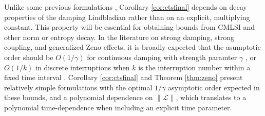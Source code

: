 \documentclass[accepted=2026-02-01, letterpaper]{quantumarticle}
\renewcommand{\L}{\mathcal{L}}
\begin{document}
Unlike some previous formulations \cite{zanardi_coherent_2014, popkov_effective_2018, burgarth_generalized_2019}, Corollary \ref{cor:ctsfinal} depends on decay properties of the damping Lindbladian rather than on an explicit, multiplying constant. This property will be essential for obtaining bounds from CMLSI and other norm or entropy decay. In the literature on strong damping, strong coupling, and generalized Zeno effects, it is broadly expected that the asumptotic order should be $O(1/\gamma)$ for continuous damping with strength paramter $\gamma$ \cite{burgarth_generalized_2019}, or $O(1/k)$ in discrete interruptions when $k$ is the interruption number within a fixed time interval \cite{mobus_optimal_2023}. Corollary \ref{cor:ctsfinal} and Theorem \ref{thm:zeno} present relatively simple formulations with the optimal $1/\gamma$ asymptotic order expected in these bounds, and a polynomial dependence on $\|\L\|$, which translates to a polynomial time-dependence when including an explicit time parameter.
\end{document}
